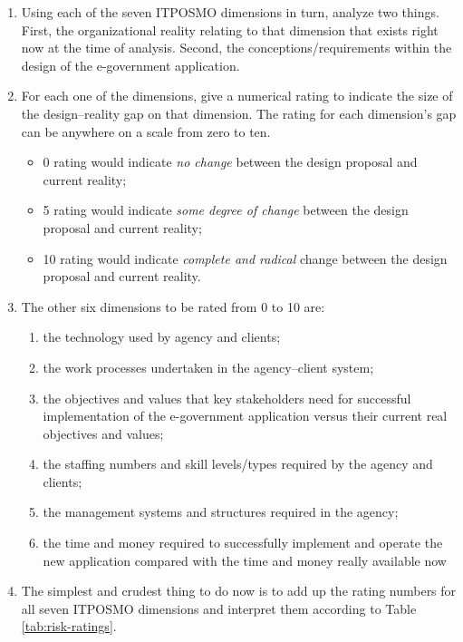 \begin{enumerate}
	\item Using each of the seven ITPOSMO
	dimensions in turn, analyze two things.
	First, the organizational reality relating
	to that dimension that exists right now
	at the time of analysis. Second, the
	conceptions/requirements within the
	design of the e-government application.
	
	\item For each one of the dimensions, give a
	numerical rating to indicate the size of
	the design–reality gap on that dimension. The rating for each dimension’s
	gap can be anywhere on a scale from
	zero to ten.
	\begin{itemize}
		\item 0 rating would indicate \textit{no change}
		between the design proposal and
		current reality;
		\item 5 rating would indicate\textit{ some degree of
		change} between the design proposal
		and current reality;
		\item 10 rating would indicate \textit{complete and
		radical} change between the design
		proposal and current reality.
	\end{itemize}

\item The other six dimensions to be rated
from 0 to 10 are:
\begin{enumerate}
	\item the technology used by agency and
	clients;
	\item the work processes undertaken in the
	agency–client system;
	\item the objectives and values that key
	stakeholders need for successful implementation of the e-government application versus their current real objectives and values;
	\item the staffing numbers and skill
	levels/types required by the agency
	and clients;
	\item the management systems and structures required in the agency;
	\item the time and money required to successfully implement and operate the
	new application compared with the
	time and money really available now
\end{enumerate}
\item The simplest and crudest thing to do
now is to add up the rating numbers for
all seven ITPOSMO dimensions and
interpret them according to Table \ref{tab:risk-ratings}.
\end{enumerate}


